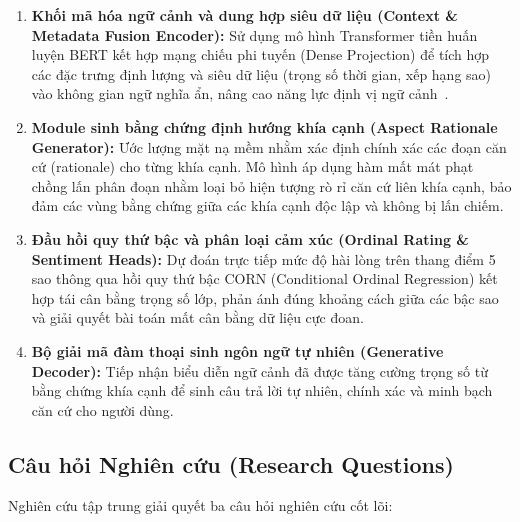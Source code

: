 \documentclass[pdflatex,sn-mathphys-num]{sn-jnl}
\theoremstyle{thmstyleone}
\theoremstyle{thmstyletwo}
\theoremstyle{thmstylethree}
\begin{document}
\begin{enumerate}
    \item \textbf{Khối mã hóa ngữ cảnh và dung hợp siêu dữ liệu (Context \& Metadata Fusion Encoder):} Sử dụng mô hình Transformer tiền huấn luyện BERT kết hợp mạng chiếu phi tuyến (Dense Projection) để tích hợp các đặc trưng định lượng và siêu dữ liệu (trọng số thời gian, xếp hạng sao) vào không gian ngữ nghĩa ẩn, nâng cao năng lực định vị ngữ cảnh~\cite{bruni2025amaqa}.
    
    \item \textbf{Module sinh bằng chứng định hướng khía cạnh (Aspect Rationale Generator):} Ước lượng mặt nạ mềm nhằm xác định chính xác các đoạn căn cứ (rationale) cho từng khía cạnh. Mô hình áp dụng hàm mất mát phạt chồng lấn phân đoạn nhằm loại bỏ hiện tượng rò rỉ căn cứ liên khía cạnh, bảo đảm các vùng bằng chứng giữa các khía cạnh độc lập và không bị lấn chiếm.
    
    \item \textbf{Đầu hồi quy thứ bậc và phân loại cảm xúc (Ordinal Rating \& Sentiment Heads):} Dự đoán trực tiếp mức độ hài lòng trên thang điểm 5 sao thông qua hồi quy thứ bậc CORN (Conditional Ordinal Regression) kết hợp tái cân bằng trọng số lớp, phản ánh đúng khoảng cách giữa các bậc sao và giải quyết bài toán mất cân bằng dữ liệu cực đoan.
    
    \item \textbf{Bộ giải mã đàm thoại sinh ngôn ngữ tự nhiên (Generative Decoder):} Tiếp nhận biểu diễn ngữ cảnh đã được tăng cường trọng số từ bằng chứng khía cạnh để sinh câu trả lời tự nhiên, chính xác và minh bạch căn cứ cho người dùng.
\end{enumerate}

\subsection{Câu hỏi Nghiên cứu (Research Questions)}
\label{subsec:research_questions}
Nghiên cứu tập trung giải quyết ba câu hỏi nghiên cứu cốt lõi:
\end{document}
